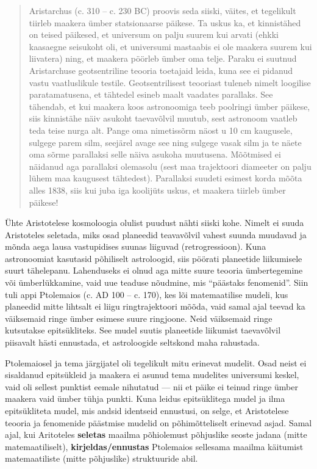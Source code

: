 \documentclass[]{book}
\begin{document}
\begin{quote}
Aristarchus (c. 310 -- c. 230 BC) proovis seda siiski, väites, et tegelikult tiirleb maakera ümber statsionaarse päikese. Ta uskus ka, et kinnistähed on teised päikesed, et universum on palju suurem kui arvati (ehkki kaasaegne seisukoht oli, et universumi mastaabis ei ole maakera suurem kui liivatera) ning, et maakera pöörleb ümber oma telje. Paraku ei suutnud Aristarchuse geotsentriline teooria toetajaid leida, kuna see ei pidanud vastu vaatluslikule testile. Geotsentrilisest teooriast tuleneb nimelt loogilise paratamatusena, et tähtedel esineb maalt vaadates parallaks. See tähendab, et kui maakera koos astronoomiga teeb poolringi ümber päikese, siis kinnistähe näiv asukoht taevavõlvil muutub, sest astronoom vaatleb teda teise nurga alt. Pange oma nimetissõrm näost u 10 cm kaugusele, sulgege parem silm, seejärel avage see ning sulgege vasak silm ja te näete oma sõrme parallaksi selle näiva asukoha muutusena. Mõõtmised ei näidanud aga parallaksi olemasolu (sest maa trajektoori diameeter on palju lühem maa kaugusest tähtedest). Parallaksi suudeti esimest korda mõõta alles 1838, siis kui juba iga koolijüts uskus, et maakera tiirleb ümber päikese!
\end{quote}

Ühte Aristotelese kosmoloogia olulist puudust nähti siiski kohe. Nimelt ei suuda Aristoteles seletada, miks osad planeedid teavavõlvil vahest suunda muudavad ja mõnda aega lausa vastupidises suunas liiguvad (retrogressioon). Kuna astronoomiat kasutasid põhiliselt astroloogid, siis pöörati planeetide liikumisele suurt tähelepanu. Lahenduseks ei olnud aga mitte suure teooria ümbertegemine või ümberlükkamine, vaid uue teaduse nõudmine, mis ``päästaks fenomenid''. Siin tuli appi Ptolemaios (c. AD 100 -- c. 170), kes lõi matemaatilise mudeli, kus planeedid mitte lihtsalt ei liigu ringtrajektoori mõõda, vaid samal ajal teevad ka väiksemaid ringe ümber esimese suure ringjoone. Neid väiksemaid ringe kutsutakse epitsükliteks. See mudel suutis planeetide liikumist taevavõlvil piisavalt hästi ennustada, et astroloogide seltskond maha rahustada.

Ptolemaiosel ja tema järgijatel oli tegelikult mitu erinevat mudelit. Osad neist ei sisaldanud epitsükleid ja maakera ei asunud tema mudelites universumi keskel, vaid oli sellest punktist eemale nihutatud --- nii et päike ei teinud ringe ümber maakera vaid ümber tühja punkti. Kuna leidus epitsüklitega mudel ja ilma epitsükliteta mudel, mis andsid identseid ennustusi, on selge, et Aristotelese teooria ja fenomenide päästmise mudelid on põhimõtteliselt erinevad asjad. Samal ajal, kui Aritoteles \textbf{seletas} maailma põhiolemust põhjuslike seoste jadana (mitte matemaatiliselt), \textbf{kirjeldas/ennustas} Ptolemaios sellesama maailma käitumist matemaatiliste (mitte põhjuslike) struktuuride abil.
\end{document}
